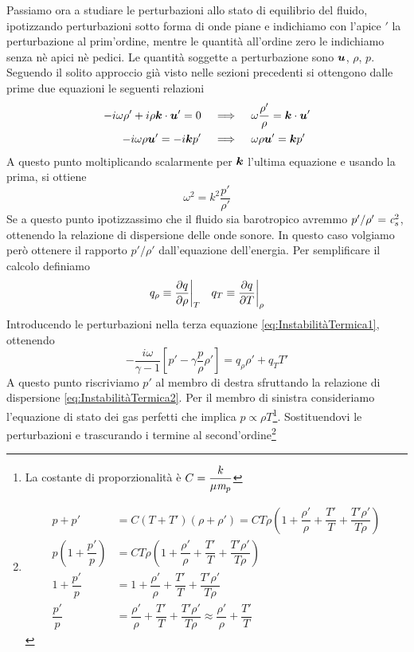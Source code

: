 Passiamo ora a studiare le perturbazioni allo stato di equilibrio del fluido, ipotizzando perturbazioni sotto forma di onde piane e indichiamo con l'apice $'$ la perturbazione al prim'ordine, mentre le quantità all'ordine zero le indichiamo senza nè apici nè pedici. Le quantità soggette a perturbazione sono $\V{u}$, $\rho$, $p$. Seguendo il solito approccio già visto nelle sezioni precedenti si ottengono dalle prime due equazioni le seguenti relazioni
\begin{align}
-i\omega \rho' + i\rho \scal{k}{u'} =0  \,\,\,\,\,\,\, & \Longrightarrow \,\,\,\,\,\,\, \omega \dfrac{\rho'}{\rho} = \scal{k}{u'} \\
-i\omega \rho \V{u}' = -i\V{k} p' \,\,\,\,\,\,\, & \Longrightarrow \,\,\,\,\,\,\, \omega \rho \V{u}' = \V{k}p' 
\end{align}
A questo punto moltiplicando scalarmente per $\V{k}$ l'ultima equazione e usando la prima, si ottiene
\begin{equation}
\omega^2 = k^2 \dfrac{p'}{\rho'} \label{eq:InstabilitàTermica2}
\end{equation}
Se a questo punto ipotizzassimo che il fluido sia barotropico avremmo $p'/\rho' = \textit{c}_{s}^2$, ottenendo la relazione di dispersione delle onde sonore. In questo caso volgiamo però ottenere il rapporto $p'/\rho'$ dall'equazione dell'energia. Per semplificare il calcolo definiamo 
\begin{align*}
&q_\rho \equiv \dfrac{\partial {q}}{\partial {\rho}}\bigg|_T
&q_T \equiv \dfrac{\partial {q}}{\partial {T}}\bigg|_\rho
\end{align*}
Introducendo le perturbazioni nella terza equazione \ref{eq:InstabilitàTermica1}, ottenendo
\begin{equation}
-\dfrac{i\omega}{\gamma-1}\left[ p'-\gamma \dfrac{p}{\rho}\rho' \right] = q_\rho \rho' + q_T T' \label{eq:InstabilitàTermica3}
\end{equation}
A questo punto riscriviamo $p'$ al membro di destra sfruttando la relazione di dispersione \ref{eq:InstabilitàTermica2}. Per il membro di sinistra consideriamo l'equazione di stato dei gas perfetti che implica $p\propto\rho T$\footnote{La costante di proporzionalità è $C=\dfrac{k}{\mu \textit{m}_{p}}$}. Sostituendovi le perturbazioni e trascurando i termine al second'ordine\footnote{\begin{align*}
p+p' &= C(T+T')(\rho+\rho') = CT\rho \left(1+\dfrac{\rho'}{\rho}+\dfrac{T'}{T} + \dfrac{T'\rho'}{T\rho} \right)\\
p\left(1+\dfrac{p'}{p}\right) &= CT\rho \left(1+\dfrac{\rho'}{\rho}+\dfrac{T'}{T} + \dfrac{T'\rho'}{T\rho} \right)\\
1+\dfrac{p'}{p} &= 1+\dfrac{\rho'}{\rho}+\dfrac{T'}{T} + \dfrac{T'\rho'}{T\rho} \\
\dfrac{p'}{p} &= \dfrac{\rho'}{\rho}+\dfrac{T'}{T} + \dfrac{T'\rho'}{T\rho} \approx \dfrac{\rho'}{\rho}+\dfrac{T'}{T}
\end{align*}} 
